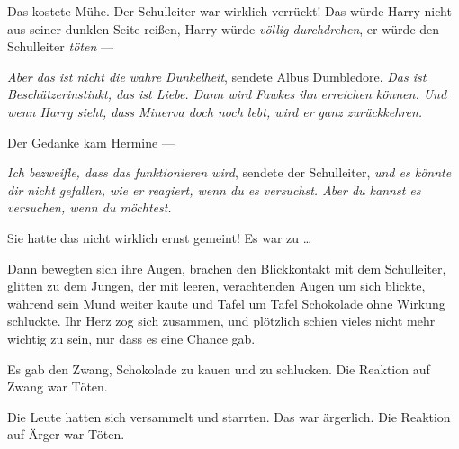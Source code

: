 Das kostete Mühe. Der Schulleiter war wirklich verrückt! Das würde Harry nicht aus seiner dunklen Seite reißen, Harry würde \emph{völlig durchdrehen}, er würde den Schulleiter \emph{töten} —

\emph{Aber das ist nicht die wahre Dunkelheit}, sendete Albus Dumbledore. \emph{Das ist Beschützerinstinkt, das ist Liebe. Dann wird Fawkes ihn erreichen können. Und wenn Harry sieht, dass Minerva doch noch lebt, wird er ganz zurückkehren.}

Der Gedanke kam Hermine —

\emph{Ich bezweifle, dass das funktionieren wird}, sendete der Schulleiter, \emph{und es könnte dir nicht gefallen, wie er reagiert, wenn du es versuchst. Aber du kannst es versuchen, wenn du möchtest.}

Sie hatte das nicht wirklich ernst gemeint! Es war zu …

Dann bewegten sich ihre Augen, brachen den Blickkontakt mit dem Schulleiter, glitten zu dem Jungen, der mit leeren, verachtenden Augen um sich blickte, während sein Mund weiter kaute und Tafel um Tafel Schokolade ohne Wirkung schluckte. Ihr Herz zog sich zusammen, und plötzlich schien vieles nicht mehr wichtig zu sein, nur dass es eine Chance gab.

\later

Es gab den Zwang, Schokolade zu kauen und zu schlucken. Die Reaktion auf Zwang war Töten.

Die Leute hatten sich versammelt und starrten. Das war ärgerlich. Die Reaktion auf Ärger war Töten.

